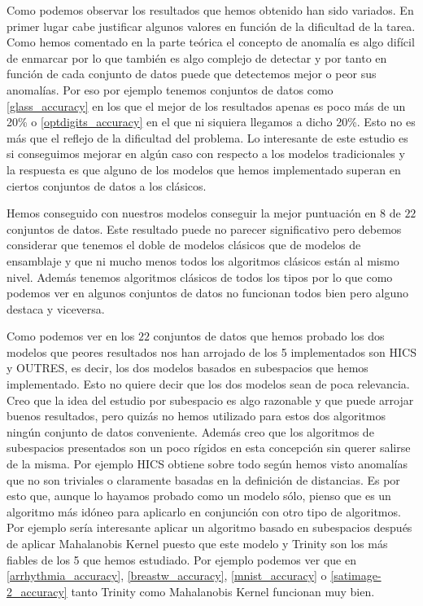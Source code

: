 Como podemos observar los resultados que hemos obtenido han sido variados. En primer lugar cabe justificar algunos valores en función de la dificultad de la tarea. Como hemos comentado en la parte teórica el concepto de anomalía es algo difícil de enmarcar por lo que también es algo complejo de detectar y por tanto en función de cada conjunto de datos puede que detectemos mejor o peor sus anomalías. Por eso por ejemplo tenemos conjuntos de datos como \ref{glass_accuracy} en los que el mejor de los resultados apenas es poco más de un 20\% o \ref{optdigits_accuracy} en el que ni siquiera llegamos a dicho 20\%. Esto no es más que el reflejo de la dificultad del problema. Lo interesante de este estudio es si conseguimos mejorar en algún caso con respecto a los modelos tradicionales y la respuesta es que alguno de los modelos que hemos implementado superan en ciertos conjuntos de datos a los clásicos.

Hemos conseguido con nuestros modelos conseguir la mejor puntuación en $8$ de $22$ conjuntos de datos. Este resultado puede no parecer significativo pero debemos considerar que tenemos el doble de modelos clásicos que de modelos de ensamblaje y que ni mucho menos todos los algoritmos clásicos están al mismo nivel. Además tenemos algoritmos clásicos de todos los tipos por lo que como podemos ver en algunos conjuntos de datos no funcionan todos bien pero alguno destaca y viceversa. 

Como podemos ver en los $22$ conjuntos de datos que hemos probado los dos modelos que peores resultados nos han arrojado de los 5 implementados son HICS y OUTRES, es decir, los dos modelos basados en subespacios que hemos implementado. Esto no quiere decir que los dos modelos sean de poca relevancia. Creo que la idea del estudio por subespacio es algo razonable y que puede arrojar buenos resultados, pero quizás no hemos utilizado para estos dos algoritmos ningún conjunto de datos conveniente. Además creo que los algoritmos de subespacios presentados son un poco rígidos en esta concepción sin querer salirse de la misma. Por ejemplo HICS obtiene sobre todo según hemos  visto anomalías que no son triviales o claramente basadas en la definición de distancias. Es por esto que, aunque lo hayamos probado como un modelo sólo, pienso que es un algoritmo más idóneo para aplicarlo en conjunción con otro tipo de algoritmos. Por ejemplo sería interesante aplicar un algoritmo basado en subespacios después de aplicar Mahalanobis Kernel puesto que este modelo y Trinity son los más fiables de los 5 que hemos estudiado. Por ejemplo podemos ver que en \ref{arrhythmia_accuracy}, \ref{breastw_accuracy}, \ref{mnist_accuracy} o \ref{satimage-2_accuracy} tanto Trinity como Mahalanobis Kernel funcionan muy bien. 

